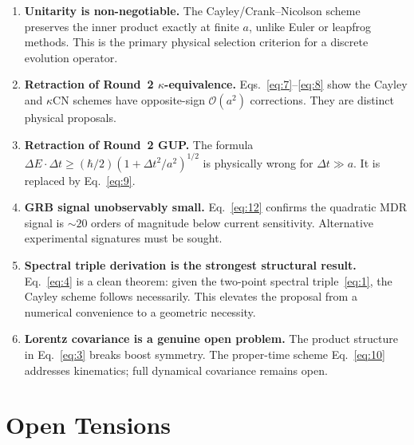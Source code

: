 \documentclass[11pt,a4paper]{article}
\begin{document}
\begin{enumerate}
  \item \textbf{Unitarity is non-negotiable.} The Cayley/Crank--Nicolson scheme preserves the inner product exactly at finite $a$, unlike Euler or leapfrog methods. This is the primary physical selection criterion for a discrete evolution operator.

  \item \textbf{Retraction of Round~2 $\kappa$-equivalence.} Eqs.~\eqref{eq:7}--\eqref{eq:8} show the Cayley and $\kappa$CN schemes have opposite-sign $\mathcal{O}(a^2)$ corrections. They are distinct physical proposals.

  \item \textbf{Retraction of Round~2 GUP.} The formula $\Delta E\cdot\Delta t\geq(\hbar/2)(1+\Delta t^2/a^2)^{1/2}$ is physically wrong for $\Delta t\gg a$. It is replaced by Eq.~\eqref{eq:9}.

  \item \textbf{GRB signal unobservably small.} Eq.~\eqref{eq:12} confirms the quadratic MDR signal is $\sim 20$ orders of magnitude below current sensitivity. Alternative experimental signatures must be sought.

  \item \textbf{Spectral triple derivation is the strongest structural result.} Eq.~\eqref{eq:4} is a clean theorem: given the two-point spectral triple~\eqref{eq:1}, the Cayley scheme follows necessarily. This elevates the proposal from a numerical convenience to a geometric necessity.

  \item \textbf{Lorentz covariance is a genuine open problem.} The product structure in Eq.~\eqref{eq:3} breaks boost symmetry. The proper-time scheme Eq.~\eqref{eq:10} addresses kinematics; full dynamical covariance remains open.
\end{enumerate}

\section{Open Tensions}
\end{document}
